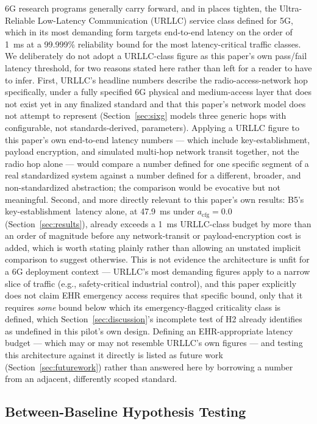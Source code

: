 \documentclass[journal]{IEEEtran}
\newcommand{\keyest}{key-establishment}
\newcommand{\acfg}{\ensuremath{a_{\text{cfg}}}}
\begin{document}
6G research programs generally carry forward, and in places tighten, the Ultra-Reliable Low-Latency Communication (URLLC) service class defined for 5G, which in its most demanding form targets end-to-end latency on the order of \qty{1}{ms} at a 99.999\% reliability bound for the most latency-critical traffic classes. We deliberately do not adopt a URLLC-class figure as this paper's own pass/fail latency threshold, for two reasons stated here rather than left for a reader to have to infer. First, URLLC's headline numbers describe the radio-access-network hop specifically, under a fully specified 6G physical and medium-access layer that does not exist yet in any finalized standard and that this paper's network model does not attempt to represent (Section~\ref{sec:sixg} models three generic hops with configurable, not standards-derived, parameters). Applying a URLLC figure to this paper's own end-to-end latency numbers --- which include \keyest, payload encryption, and simulated multi-hop network transit together, not the radio hop alone --- would compare a number defined for one specific segment of a real standardized system against a number defined for a different, broader, and non-standardized abstraction; the comparison would be evocative but not meaningful. Second, and more directly relevant to this paper's own results: B5's \keyest\ latency alone, at \qty{47.9}{ms} under $\acfg=0.0$ (Section~\ref{sec:results}), already exceeds a \qty{1}{ms} URLLC-class budget by more than an order of magnitude before any network-transit or payload-encryption cost is added, which is worth stating plainly rather than allowing an unstated implicit comparison to suggest otherwise. This is not evidence the architecture is unfit for a 6G deployment context --- URLLC's most demanding figures apply to a narrow slice of traffic (e.g., safety-critical industrial control), and this paper explicitly does not claim EHR emergency access requires that specific bound, only that it requires \emph{some} bound below which its emergency-flagged criticality class is defined, which Section~\ref{sec:discussion}'s incomplete test of H2 already identifies as undefined in this pilot's own design. Defining an EHR-appropriate latency budget --- which may or may not resemble URLLC's own figures --- and testing this architecture against it directly is listed as future work (Section~\ref{sec:futurework}) rather than answered here by borrowing a number from an adjacent, differently scoped standard.

\subsection{Between-Baseline Hypothesis Testing}
\end{document}
